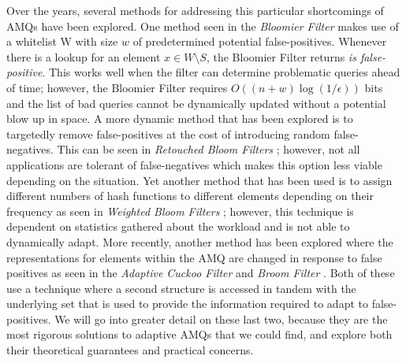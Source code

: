 \documentclass[../paper.tex]{subfiles}
\begin{document}
Over the years, several methods for addressing this particular shortcomings of AMQs have been explored.  
One method seen in the {\it Bloomier Filter} \cite{bloomier-filter} makes use of a whitelist 
W with size $w$ of predetermined potential false-positives.  Whenever there is a lookup 
for an element $x \in W \setminus S$, the Bloomier Filter returns \textit{is false-positive}.   
This works well when the filter can determine problematic queries ahead of time; however, the 
Bloomier Filter requires $O((n+w)\log(1/\epsilon))$ bits and the list of bad queries 
cannot be dynamically updated without a potential blow up in space.   A more dynamic 
method that has been explored is to targetedly remove false-positives at the cost of 
introducing random false-negatives.  This can be seen in {\it Retouched Bloom Filters} 
\cite{retouched-filter}; however, not all applications are tolerant of false-negatives 
which makes this option less viable depending on the situation.  Yet another method 
that has been used is to assign different numbers of hash functions to different elements
depending on their frequency as seen in {\it Weighted Bloom Filters} \cite{weighted-filter};
however, this technique is dependent on statistics gathered about the workload and is not able to dynamically
adapt.  More recently, another method has been explored where the representations for 
elements within the AMQ are changed in response to false positives as seen in the {\it 
Adaptive Cuckoo Filter} \cite{adaptive-cuckoo} and {\it Broom Filter} \cite{broom-filter}. 
Both of these use a technique where a second structure is accessed in tandem 
with the underlying set that is used to provide the information required to adapt to 
false-positives.  We will go into greater detail on these last two, because they are the most
rigorous solutions to adaptive AMQs that we could find, and explore both their theoretical guarantees
and practical concerns.  
\end{document}
